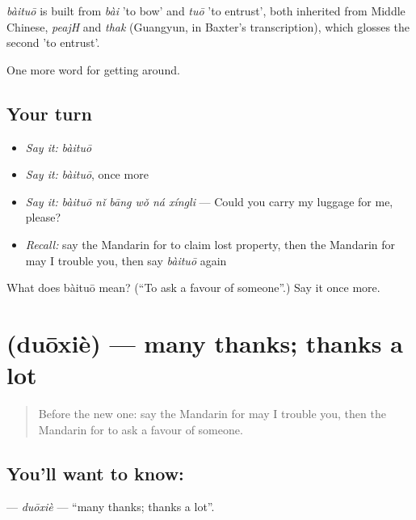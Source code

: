 \begin{cousinweb}
\emph{bàituō} is built from \emph{bài} 'to bow' and \emph{tuō} 'to entrust', both inherited from Middle Chinese, \emph{peajH} and \emph{thak} (Guangyun, in Baxter's transcription), which glosses the second 'to entrust'.
\end{cousinweb}

\begin{grammarlens}[title={What you've built}]
One more word for getting around.
\end{grammarlens}

\subsection*{Your turn}
\begin{itemize}
\raggedright
  \item \emph{Say it:} \emph{bàituō}
  \item \emph{Say it:} \emph{bàituō}, once more
  \item \emph{Say it:} \emph{bàituō nǐ bāng wǒ ná xíngli} — Could you carry my luggage for me, please?
  \item \emph{Recall:} say the Mandarin for to claim lost property, then the Mandarin for may I trouble you, then say \emph{bàituō} again
\end{itemize}

\begin{tcolorbox}[breakable,colback=teal!4,colframe=teal!35!black,title={Before you move on}]
What does bàituō mean? (\textquotedblleft{}To ask a favour of someone\textquotedblright{}.) Say it once more.
\end{tcolorbox}
\section[\texorpdfstring{\zh{多谢} (duōxiè)}{多谢 (duōxiè)}]{ (duōxiè) — many thanks; thanks a lot}

\label{lesson:ZH-C457-duoxie}



\begin{quote}
Before the new one: say the Mandarin for may I trouble you, then the Mandarin for to ask a favour of someone.
\end{quote}

\subsection*{You'll want to know: }
\textbf{} — \emph{duōxiè} — \textquotedblleft{}many thanks; thanks a lot\textquotedblright{}.

